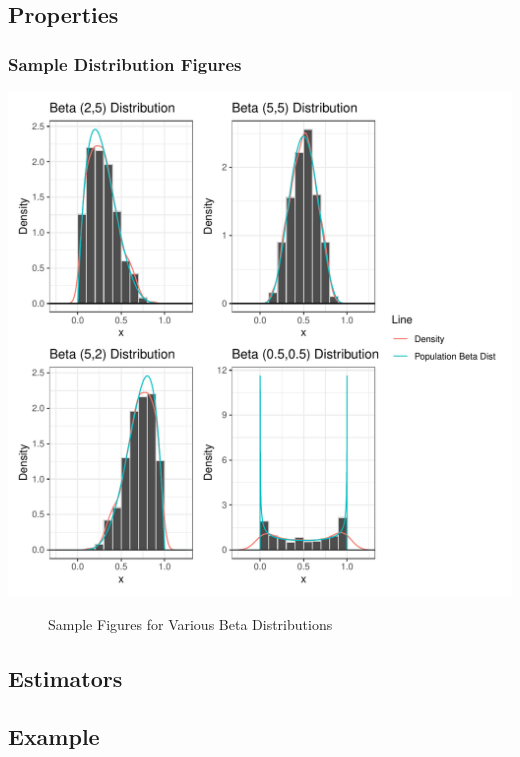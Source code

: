 \documentclass{article}\usepackage[]{graphicx}\usepackage[]{xcolor}
\makeatletter
\def\maxwidth{ %
  \ifdim\Gin@nat@width>\linewidth
    \linewidth
  \else
    \Gin@nat@width
  \fi
}
\newenvironment{knitrout}{}{} %
\makeatother
\begin{document}
\subsection{Properties}
\subsubsection{Sample Distribution Figures}
\begin{knitrout}\scriptsize
{}\color{fgcolor}
\includegraphics[width=\maxwidth]{figure/plot2-1} 
\end{knitrout}

\begin{figure}[H]
\begin{center}

\caption{Sample Figures for Various Beta Distributions}
\label{samplehistograms} %
\end{center}
\end{figure}

\subsection{Estimators}

\subsection{Example}
\end{document}
